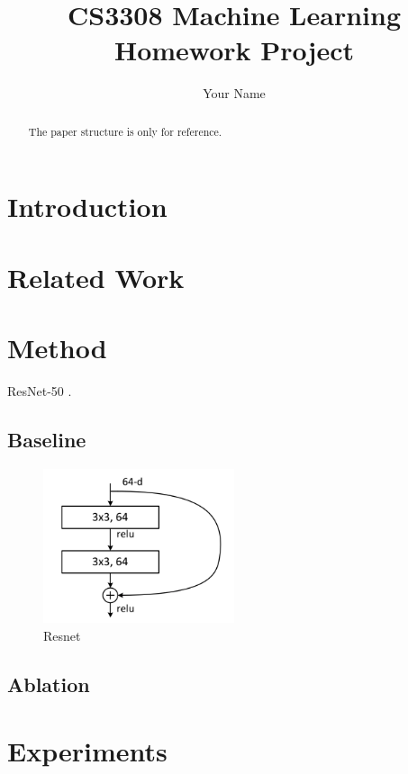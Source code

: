 \documentclass{article}
\title{CS3308 Machine Learning Homework Project}
\author{
  Your Name
}
\begin{document}
\maketitle


\begin{abstract}
The paper structure is only for reference.
\end{abstract}


\section{Introduction}


\section{Related Work}


\section{Method}

ResNet-50 \cite{he2016deep}.

\subsection{Baseline}

\begin{figure}[H] %
    \centering %
    \includegraphics[width=0.5\textwidth]{image.png} %
    \caption{Resnet} %
    \label{Fig.img1} %
\end{figure}

\subsection{Ablation}

\section{Experiments}
\end{document}
